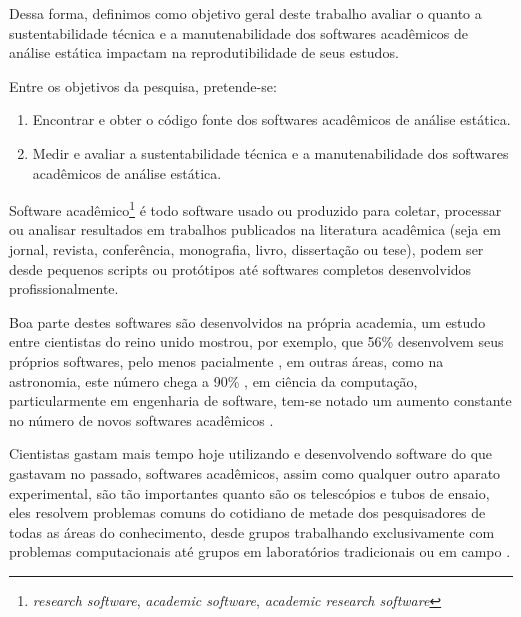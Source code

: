Dessa forma, definimos como objetivo geral deste trabalho avaliar o quanto a
sustentabilidade técnica e a manutenabilidade dos softwares acadêmicos de
análise estática impactam na reprodutibilidade de seus estudos.

Entre os objetivos da pesquisa, pretende-se:

\begin{enumerate}
  \item Encontrar e obter o código fonte dos softwares acadêmicos de análise
        estática.
  \item Medir e avaliar a sustentabilidade técnica e a manutenabilidade dos
        softwares acadêmicos de análise estática.
\end{enumerate}



Software acadêmico\footnote{{\it research software}, {\it academic software},
{\it academic research software}} é todo software usado ou produzido para
coletar, processar ou analisar resultados em trabalhos publicados na literatura
acadêmica (seja em jornal, revista, conferência, monografia, livro, dissertação
ou tese), podem ser desde pequenos scripts ou protótipos até softwares
completos desenvolvidos profissionalmente.

Boa parte destes softwares são desenvolvidos na própria academia, um estudo
entre cientistas do reino unido mostrou, por exemplo, que 56\% desenvolvem seus próprios
softwares, pelo menos pacialmente \cite{hettrick_2014_14809}, em outras áreas,
como na astronomia, este número chega a 90\%
\cite{momcheva2015software}, em ciência da computação, particularmente em
engenharia de software, tem-se notado um aumento constante no número de novos
softwares acadêmicos \cite{allen2017engineering}.

Cientistas gastam mais tempo hoje utilizando e desenvolvendo
software do que gastavam no passado, softwares acadêmicos, assim como
qualquer outro aparato experimental, são tão importantes quanto
são os telescópios e tubos de ensaio, eles resolvem problemas comuns do
cotidiano de metade dos pesquisadores de todas as áreas do conhecimento, desde grupos
trabalhando exclusivamente com problemas computacionais até grupos em
laboratórios tradicionais ou em campo \cite{wilson2014best}.

